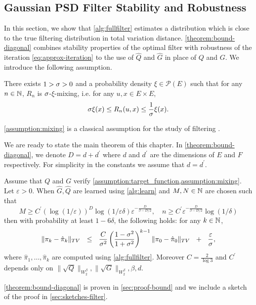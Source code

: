 \subsection{Gaussian PSD Filter Stability and Robustness}\label{sec:theory}
In this section, we show that \cref{alg:fullfilter} estimates a distribution which is close to the true filtering distribution in total variation distance. \cref{theorem:bound-diagonal} combines stability properties of the optimal filter with robustness of the iteration \cref{eq:approx-iteration} to the use of $\hat Q$ and $\hat G$ in place of $Q$ and $G$. We introduce the following assumption.

\begin{assumption}[$R_n$ is mixing]\label{assumption:mixing}
    There exists $1 >\sigma > 0$ and a probability density $\xi\in\mathcal P(E)$ such that for any $n \in\mathbb N$, $R_n$ is $\sigma$-$\xi$-mixing, i.e. for any $u, x \in E \times E$,
    \begin{align}
        \sigma \xi(x) \leq R_n(u, x) \leq \frac{1}{\sigma}\xi(x).
    \end{align}
\end{assumption}
\cref{assumption:mixing} is a classical assumption for the study of filtering \citep{cappehmm}.

We are ready to state the main theorem of this chapter. In \cref{theorem:bound-diagonal}, we denote $D = d + d^\prime$ where $d$ and $d^\prime$ are the dimensions of $E$ and $F$ respectively. For simplicity in the constants we assume that $d = d^\prime$.

\begin{theorem}\label{theorem:bound-diagonal}
Assume that $Q$ and $G$ verify \cref{assumption:target_function,assumption:mixing}. Let $\varepsilon > 0$.
When $\hat{G}, \hat{Q}$ are learned using \cref{alg:learn} and $M, N \in \mathbb N$ are chosen such that
%
$$M \geq C^\prime(\log\left(1/\varepsilon\right))^D\log\left(1/\varepsilon\delta\right)\varepsilon^{-\frac{D}{\beta - D/2}}, \quad n \geq C^\prime \varepsilon^{-\frac{D}{\beta - D/2}}\log (1/\delta)$$
%
then with probability at least $1-6\delta$, the following holds: for any $k \in \mathbb N$,
\begin{align}
    \Vert \pi_k - \hat\pi_k\Vert_{TV} ~~\leq~~ \frac{C}{\sigma^2}\left(\frac{1-\sigma^2}{1 + \sigma^2}\right)^{k-1}\|\pi_0 - \hat{\pi}_0\|_{TV} ~~+~~ \frac{\varepsilon}{\sigma},
\end{align}
where $\hat{\pi}_1,\dots, \hat{\pi}_k$ are computed using \cref{alg:fullfilter}. Moreover $C=\frac{2}{\log 3}$ and $C^\prime$ depends only on $\|\sqrt{Q}\|_{W^\beta_2}, \|\sqrt{G}\|_{W^\beta_2}, \beta, d$.
\end{theorem}
\cref{theorem:bound-diagonal} is proven in \cref{sec:proof-bound} and we include a sketch of the proof in \cref{sec:sketches-filter}.

